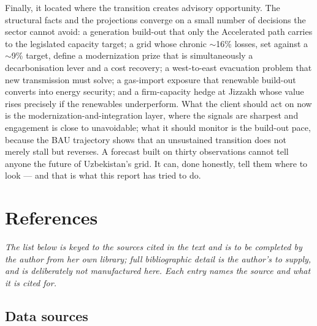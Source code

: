 \documentclass[10pt,twocolumn]{article}
\begin{document}
Finally, it located where the transition creates advisory opportunity. The structural facts and the projections converge on a small number of decisions the sector cannot avoid: a generation build-out that only the Accelerated path carries to the legislated capacity target; a grid whose chronic $\sim$16\% losses, set against a $\sim$9\% target, define a modernization prize that is simultaneously a decarbonisation lever and a cost recovery; a west-to-east evacuation problem that new transmission must solve; a gas-import exposure that renewable build-out converts into energy security; and a firm-capacity hedge at Jizzakh whose value rises precisely if the renewables underperform. What the client should act on now is the modernization-and-integration layer, where the signals are sharpest and engagement is close to unavoidable; what it should monitor is the build-out pace, because the BAU trajectory shows that an unsustained transition does not merely stall but reverses. A forecast built on thirty observations cannot tell anyone the future of Uzbekistan's grid. It can, done honestly, tell them where to look --- and that is what this report has tried to do.

\section*{References}

\textit{The list below is keyed to the sources cited in the text and is to be completed by the author from her own library; full bibliographic detail is the author's to supply, and is deliberately not manufactured here. Each entry names the source and what it is cited for.}

\subsection*{Data sources}
\end{document}

